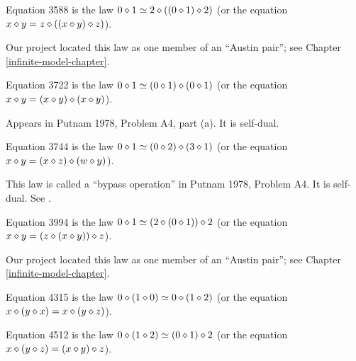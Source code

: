 \begin{definition}[Equation 3588]
  \label{eq3588}\leanok{}
  Equation 3588 is the law $0 \diamond 1 \simeq 2 \diamond ((0 \diamond 1) \diamond 2)$ (or the equation $x \diamond y = z \diamond ((x \diamond y) \diamond z)$).
\end{definition}

Our project located this law as one member of an ``Austin pair''; see Chapter \ref{infinite-model-chapter}.

\begin{definition}[Equation 3722]\label{eq3722}\leanok{}  Equation 3722 is the law $0 \diamond 1  \simeq  (0 \diamond 1) \diamond (0 \diamond 1)$ (or the equation $x \diamond y = (x \diamond y) \diamond (x \diamond y)$).
\end{definition}

Appears in Putnam 1978, Problem A4, part (a).  It is self-dual.

\begin{definition}[Equation 3744]\label{eq3744}\leanok{}  Equation 3744 is the law $0 \diamond 1  \simeq  (0 \diamond 2) \diamond (3 \diamond 1)$ (or the equation $x \diamond y = (x \diamond z) \diamond (w \diamond y)$).
\end{definition}

This law is called a ``bypass operation'' in Putnam 1978, Problem A4. It is self-dual.  See .

\begin{definition}[Equation 3994]
  \label{eq3994}
  Equation 3994 is the law $0 \diamond 1 \simeq (2 \diamond (0 \diamond 1)) \diamond 2$ (or the equation $x \diamond y = (z \diamond (x \diamond y)) \diamond z$).
\end{definition}

Our project located this law as one member of an ``Austin pair''; see Chapter \ref{infinite-model-chapter}.

\begin{definition}[Equation 4315]\label{eq4315}\leanok{}  Equation 4315 is the law $0 \diamond (1 \diamond 0)  \simeq  0 \diamond (1 \diamond 2)$ (or the equation $x \diamond (y \diamond x) = x \diamond (y \diamond z)$).
\end{definition}

\begin{definition}[Equation 4512]\label{eq4512}\leanok{}  Equation 4512 is the law $0 \diamond (1 \diamond 2)  \simeq  (0 \diamond 1) \diamond 2$ (or the equation $x \diamond (y \diamond z) = (x \diamond y) \diamond z$).
\end{definition}

